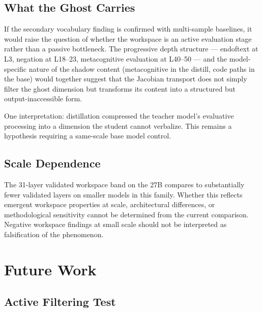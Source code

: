 \documentclass[11pt,a4paper]{article}
\begin{document}
\subsection{What the Ghost Carries}

If the secondary vocabulary finding is confirmed with multi-sample baselines, it would raise the question of whether the workspace is an active evaluation stage rather than a passive bottleneck. The progressive depth structure --- endoftext at L3, negation at L18--23, metacognitive evaluation at L40--50 --- and the model-specific nature of the shadow content (metacognitive in the distill, code paths in the base) would together suggest that the Jacobian transport does not simply filter the ghost dimension but transforms its content into a structured but output-inaccessible form.

One interpretation: distillation compressed the teacher model's evaluative processing into a dimension the student cannot verbalize. This remains a hypothesis requiring a same-scale base model control.

\subsection{Scale Dependence}

The 31-layer validated workspace band on the 27B compares to substantially fewer validated layers on smaller models in this family. Whether this reflects emergent workspace properties at scale, architectural differences, or methodological sensitivity cannot be determined from the current comparison. Negative workspace findings at small scale should not be interpreted as falsification of the phenomenon.

\section{Future Work}

\subsection{Active Filtering Test}
\label{sec:active-filtering}
\end{document}
